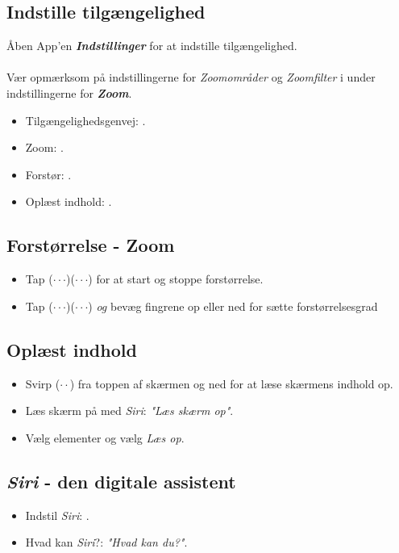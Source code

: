 \documentclass[a4paper, landscape, 10pt]{scrartcl}
\begin{document}
\begin{multicols}{2}
\end{multicols}

\newpage
\hrulefill{}
\begin{multicols}{2}

\subsection*{Indstille tilgængelighed}
Åben App'en \textbf{\textit{Indstillinger}} for at indstille tilgængelighed. \\ \\
Vær opmærksom på indstillingerne for \emph{Zoomområder} og \emph{Zoomfilter} i under indstillingerne for \textbf{\emph{Zoom}}.
\begin{itemize}
  \item {Tilgængelighedsgenvej: .}
  \item {Zoom: .}
  \item {Forstør: .}
  \item {Oplæst indhold: .}
\end{itemize}

\subsection*{Forstørrelse - Zoom}
\begin{itemize}
  \item{Tap ($\cdot\cdot\cdot$)($\cdot\cdot\cdot$) for at start og stoppe forstørrelse.}
  \item{Tap ($\cdot\cdot\cdot$)($\cdot\cdot\cdot$) \emph{og} bevæg fingrene op eller ned for sætte forstørrelsesgrad}
\end{itemize}

\subsection*{Oplæst indhold}
\begin{itemize}
  \item{Svirp ($\cdot\cdot$) fra toppen af skærmen og ned for at læse skærmens indhold op.}
  \item{Læs skærm på med \emph{Siri}: \textit{"Læs skærm op"}.}
  \item{Vælg elementer og vælg \emph{Læs op}.}
\end{itemize}

\subsection*{\emph{Siri} - den digitale assistent}
\begin{itemize}
  \item {Indstil \emph{Siri}: .}
  \item {Hvad kan \emph{Siri}?: \textit{"Hvad kan du?"}.}
\end{itemize}


\end{multicols}
\end{document}
